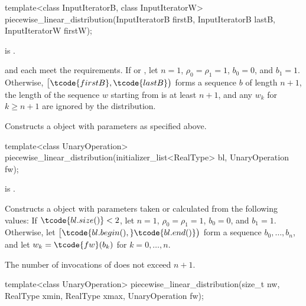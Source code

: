 \begin{itemdecl}
template<class InputIteratorB, class InputIteratorW>
 piecewise_linear_distribution(InputIteratorB firstB, InputIteratorB lastB,
                               InputIteratorW firstW);
\end{itemdecl}

\begin{itemdescr}
\pnum
\mandates
{} is .

\pnum
\expects
   and 
   each meet the
   requirements.
 If 
 or ,
 let $n = 1$,
     $\rho_0 = \rho_1 = 1$,
     $b_0 = 0$,
 and $b_1 = 1$.
 Otherwise,
 $\bigl[\tcode{firstB}, \tcode{lastB}\bigr)$
 forms a sequence $b$ of length $n+1$,
 the length of the sequence $w$ starting from 
 is at least $n+1$,
 and any $w_k$ for $k \geq n + 1$ are ignored by the distribution.

\pnum
\effects
Constructs a  object
 with parameters as specified above.
\end{itemdescr}


%
\begin{itemdecl}
template<class UnaryOperation>
 piecewise_linear_distribution(initializer_list<RealType> bl, UnaryOperation fw);
\end{itemdecl}

\begin{itemdescr}
\pnum
\mandates
{} is .

\pnum
\effects
Constructs a  object
 with parameters taken or calculated
 from the following values:
 If $\tcode{bl.size()} < 2$,
 let $n = 1$,
     $\rho_0 = \rho_1 = 1$,
     $b_0 = 0$,
 and $b_1 = 1$.
 Otherwise,
 let $\bigl[\tcode{bl.begin(),} \tcode{bl.end()}\bigr)$
 form a sequence $b_0, \dotsc, b_n$,
 and
 let $w_k = \tcode{fw}(b_k)$
 for $k = 0, \dotsc, n$.

\pnum
\complexity
The number of invocations of  does not exceed $n+1$.
\end{itemdescr}


%
\begin{itemdecl}
template<class UnaryOperation>
 piecewise_linear_distribution(size_t nw, RealType xmin, RealType xmax, UnaryOperation fw);
\end{itemdecl}

